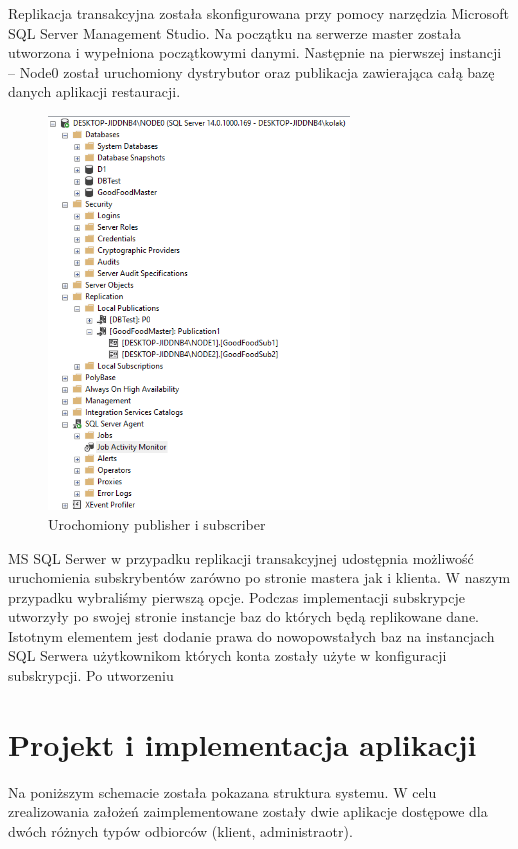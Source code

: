 \documentclass{article}
\begin{document}
	Replikacja transakcyjna została skonfigurowana przy pomocy narzędzia Microsoft SQL Server Management Studio. Na początku na serwerze master została utworzona i wypełniona początkowymi danymi. Następnie na pierwszej instancji – Node0 został uruchomiony dystrybutor oraz publikacja zawierająca całą bazę danych aplikacji restauracji.
	
	\begin{figure}[hbt!]
		\includegraphics[width=8cm]{Files/Pictures/postawionaReplikacja}
		\centering
		\caption{Urochomiony publisher i subscriber}
	\end{figure}
	
	MS SQL Serwer w przypadku replikacji transakcyjnej udostępnia możliwość uruchomienia subskrybentów zarówno po stronie mastera jak i klienta. W naszym przypadku wybraliśmy pierwszą opcje. Podczas implementacji subskrypcje utworzyły po swojej stronie instancje baz do których będą replikowane dane. Istotnym elementem jest dodanie prawa do nowopowstałych baz na instancjach SQL Serwera użytkownikom których konta zostały użyte w konfiguracji subskrypcji. Po utworzeniu 
	
	
	\newpage	

\section{Projekt i implementacja aplikacji}
Na poniższym schemacie została pokazana struktura systemu. W celu zrealizowania założeń zaimplementowane zostały dwie aplikacje dostępowe dla dwóch różnych typów odbiorców (klient, administraotr).
\end{document}
